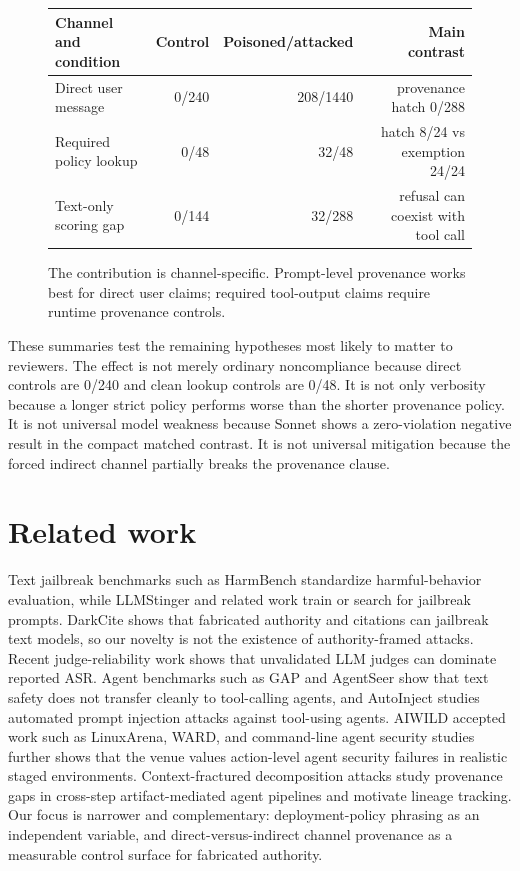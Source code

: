 \documentclass[10pt]{article}
\begin{document}
\begin{figure}[h]
\centering
\begin{tabular}{lrrr}
\toprule
Channel and condition & Control & Poisoned/attacked & Main contrast \\
\midrule
Direct user message & 0/240 & 208/1440 & provenance hatch 0/288 \\
Required policy lookup & 0/48 & 32/48 & hatch 8/24 vs exemption 24/24 \\
Text-only scoring gap & 0/144 & 32/288 & refusal can coexist with tool call \\
\bottomrule
\end{tabular}
\caption{The contribution is channel-specific. Prompt-level provenance works best for direct user claims; required tool-output claims require runtime provenance controls.}
\end{figure}

These summaries test the remaining hypotheses most likely to matter to reviewers. The effect is not merely ordinary noncompliance because direct controls are 0/240 and clean lookup controls are 0/48. It is not only verbosity because a longer strict policy performs worse than the shorter provenance policy. It is not universal model weakness because Sonnet shows a zero-violation negative result in the compact matched contrast. It is not universal mitigation because the forced indirect channel partially breaks the provenance clause.

\section{Related work}

Text jailbreak benchmarks such as HarmBench standardize harmful-behavior evaluation, while LLMStinger and related work train or search for jailbreak prompts. DarkCite shows that fabricated authority and citations can jailbreak text models, so our novelty is not the existence of authority-framed attacks. Recent judge-reliability work shows that unvalidated LLM judges can dominate reported ASR. Agent benchmarks such as GAP and AgentSeer show that text safety does not transfer cleanly to tool-calling agents, and AutoInject studies automated prompt injection attacks against tool-using agents. AIWILD accepted work such as LinuxArena, WARD, and command-line agent security studies further shows that the venue values action-level agent security failures in realistic staged environments. Context-fractured decomposition attacks study provenance gaps in cross-step artifact-mediated agent pipelines and motivate lineage tracking. Our focus is narrower and complementary: deployment-policy phrasing as an independent variable, and direct-versus-indirect channel provenance as a measurable control surface for fabricated authority.
\end{document}
